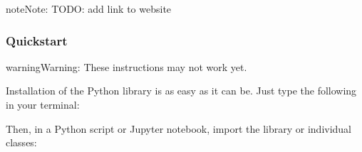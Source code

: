\documentclass[letterpaper,10pt,english]{sphinxmanual}
\begin{document}
\begin{sphinxadmonition}{note}{Note:}
\sphinxAtStartPar
TODO: add link to website
\end{sphinxadmonition}
\subsubsection*{Quickstart}

\begin{sphinxadmonition}{warning}{Warning:}
\sphinxAtStartPar
These instructions may not work yet.
\end{sphinxadmonition}

\sphinxAtStartPar
Installation of the  Python library is as easy as it can be. Just
type the following in your terminal:

\begin{sphinxVerbatim}[commandchars=\\\{\}]
  
\end{sphinxVerbatim}

\sphinxAtStartPar
Then, in a Python script or Jupyter notebook, import the library or individual classes:

\begin{sphinxVerbatim}[commandchars=\\\{\}]
    

     
     

   

  
\end{sphinxVerbatim}
\end{document}

